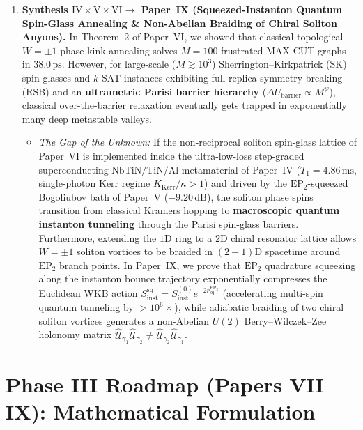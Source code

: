 \documentclass[11pt,letterpaper]{article}
\begin{document}
\begin{enumerate}
    \item \textbf{Synthesis $\mathrm{IV} \times \mathrm{V} \times \mathrm{VI} \longrightarrow$ Paper~IX (Squeezed-Instanton Quantum Spin-Glass Annealing \& Non-Abelian Braiding of Chiral Soliton Anyons).}
    In Theorem~2 of Paper~VI, we showed that classical topological $W = \pm 1$ phase-kink annealing solves $M = 100$ frustrated MAX-CUT graphs in $38.0\,\mathrm{ps}$. However, for large-scale ($M \gtrsim 10^3$) Sherrington--Kirkpatrick (SK) spin glasses and $k$-SAT instances exhibiting full replica-symmetry breaking (RSB) and an \textbf{ultrametric Parisi barrier hierarchy} ($\Delta U_{\mathrm{barrier}} \propto M^\psi$), classical over-the-barrier relaxation eventually gets trapped in exponentially many deep metastable valleys.
    \begin{itemize}
        \item \textit{The Gap of the Unknown:} If the non-reciprocal soliton spin-glass lattice of Paper~VI is implemented inside the ultra-low-loss step-graded superconducting $\mathrm{NbTiN/TiN/Al}$ metamaterial of Paper~IV ($T_1 = 4.86\,\mathrm{ms}$, single-photon Kerr regime $K_{\mathrm{Kerr}}/\kappa > 1$) and driven by the $\mathrm{EP}_2$-squeezed Bogoliubov bath of Paper~V ($-9.20\,\mathrm{dB}$), the soliton phase spins transition from classical Kramers hopping to \textbf{macroscopic quantum instanton tunneling} through the Parisi spin-glass barriers. Furthermore, extending the $1\mathrm{D}$ ring to a $2\mathrm{D}$ chiral resonator lattice allows $W = \pm 1$ soliton vortices to be braided in $(2+1)\mathrm{D}$ spacetime around $\mathrm{EP}_2$ branch points. In Paper~IX, we prove that $\mathrm{EP}_2$ quadrature squeezing along the instanton bounce trajectory exponentially compresses the Euclidean WKB action $S_{\mathrm{inst}}^{\mathrm{sq}} = S_{\mathrm{inst}}^{(0)}e^{-2 r_{\mathrm{sq}}^{\mathrm{EP}_2}}$ (accelerating multi-spin quantum tunneling by $>10^6\times$), while adiabatic braiding of two chiral soliton vortices generates a non-Abelian $U(2)$ Berry--Wilczek--Zee holonomy matrix $\hat{\mathcal{U}}_{\gamma_1}\hat{\mathcal{U}}_{\gamma_2} \neq \hat{\mathcal{U}}_{\gamma_2}\hat{\mathcal{U}}_{\gamma_1}$.
    \end{itemize}
\end{enumerate}

\section{Phase III Roadmap (Papers VII--IX): Mathematical Formulation}
\end{document}
